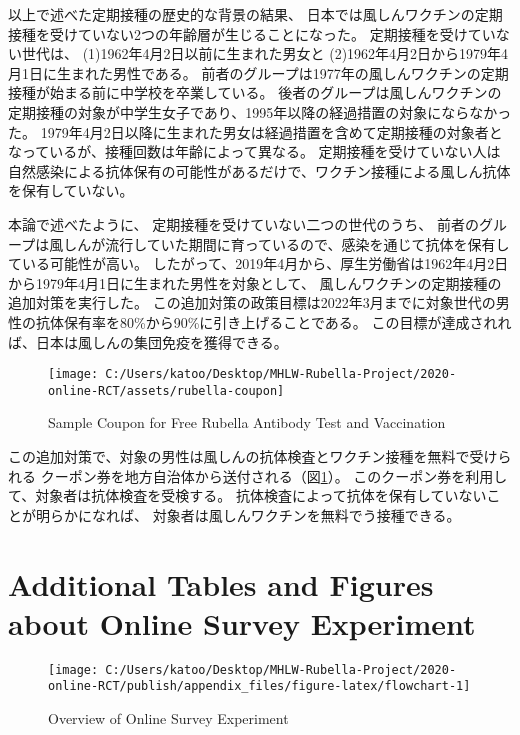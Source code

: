 \documentclass[
  11pt,
  a4paper,
]{article}
\begin{document}
以上で述べた定期接種の歴史的な背景の結果、
日本では風しんワクチンの定期接種を受けていない2つの年齢層が生じることになった。
定期接種を受けていない世代は、
(1)1962年4月2日以前に生まれた男女と
(2)1962年4月2日から1979年4月1日に生まれた男性である。
前者のグループは1977年の風しんワクチンの定期接種が始まる前に中学校を卒業している。
後者のグループは風しんワクチンの定期接種の対象が中学生女子であり、1995年以降の経過措置の対象にならなかった。
1979年4月2日以降に生まれた男女は経過措置を含めて定期接種の対象者となっているが、接種回数は年齢によって異なる。
定期接種を受けていない人は自然感染による抗体保有の可能性があるだけで、ワクチン接種による風しん抗体を保有していない。

本論で述べたように、
定期接種を受けていない二つの世代のうち、
前者のグループは風しんが流行していた期間に育っているので、感染を通じて抗体を保有している可能性が高い。
したがって、2019年4月から、厚生労働省は1962年4月2日から1979年4月1日に生まれた男性を対象として、
風しんワクチンの定期接種の追加対策を実行した。
この追加対策の政策目標は2022年3月までに対象世代の男性の抗体保有率を80\%から90\%に引き上げることである。
この目標が達成されれば、日本は風しんの集団免疫を獲得できる。

\begin{figure}[t]
\texttt{[image: C:/Users/katoo/Desktop/MHLW-Rubella-Project/2020-online-RCT/assets/rubella-coupon]} \caption{Sample Coupon for Free Rubella Antibody Test and Vaccination}\label{fig:coupon}
\end{figure}

この追加対策で、対象の男性は風しんの抗体検査とワクチン接種を無料で受けられる
クーポン券を地方自治体から送付される（図\ref{fig:coupon}）。
このクーポン券を利用して、対象者は抗体検査を受検する。
抗体検査によって抗体を保有していないことが明らかになれば、
対象者は風しんワクチンを無料でう接種できる。

\clearpage

\hypertarget{additional-tables-and-figures-about-online-survey-experiment}{%
\section{Additional Tables and Figures about Online Survey Experiment}\label{additional-tables-and-figures-about-online-survey-experiment}}

\begin{figure}[t]
\texttt{[image: C:/Users/katoo/Desktop/MHLW-Rubella-Project/2020-online-RCT/publish/appendix\_files/figure-latex/flowchart-1]} \caption{Overview of Online Survey Experiment}\label{fig:flowchart}
\end{figure}
\end{document}
